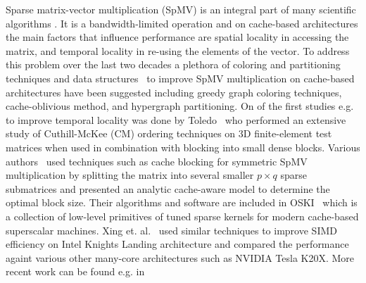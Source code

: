 


Sparse matrix-vector multiplication (SpMV) is an integral part of many scientific algorithms . It is a bandwidth-limited operation and on cache-based architectures the main factors that influence performance are spatial locality in accessing the matrix, and temporal locality in re-using the elements of the vector. To address this problem over the last two decades a plethora of coloring and partitioning techniques and data structures~\cite{Liu:2015:CES:2751205.2751209} to improve SpMV multiplication on cache-based architectures have been suggested including greedy graph coloring techniques, cache-oblivious method, and hypergraph partitioning. On of the first studies e.g. to improve temporal locality was done by Toledo~\cite{Toledo:1997:IMP:279511.279532} who performed an extensive study of Cuthill-McKee (CM) ordering techniques on 3D finite-element test matrices when used in combination with blocking into small dense blocks. Various authors~\cite{Buluc:2011:RMA:2058524.2059503,Williams:2009:OSM:1513001.1513318,doi:10.1177/1094342004041296} used techniques such as cache blocking for symmetric SpMV multiplication by splitting the matrix into several smaller $p \times q$ sparse submatrices and presented an analytic cache-aware model to determine the optimal block size. Their algorithms and software are included in OSKI~\cite{1742-6596-16-1-071} which is a collection of low-level primitives of tuned sparse kernels for modern cache-based superscalar machines. Xing et. al.~\cite{Liu:2013:ESM:2464996.2465013} used similar techniques to improve SIMD efficiency on Intel Knights Landing architecture
and compared the performance againt various other many-core architectures such as NVIDIA Tesla K20X. More recent work can be found e.g. in~\cite{Buluc:2011:RMA:2058524.2059503}

